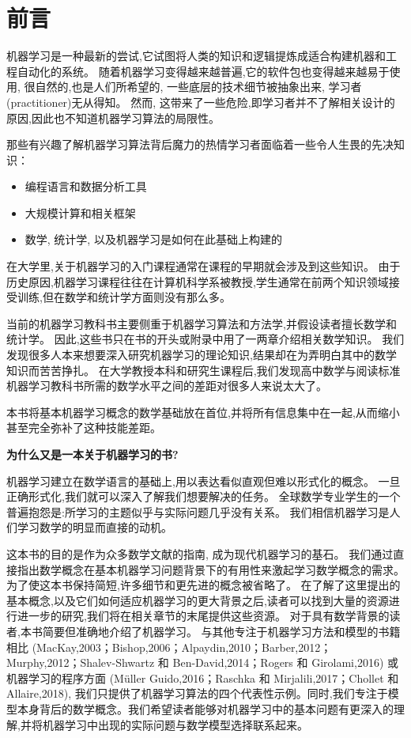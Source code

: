 \chapter{前言}

机器学习是一种最新的尝试,它试图将人类的知识和逻辑提炼成适合构建机器和工程自动化的系统。
随着机器学习变得越来越普遍,它的软件包也变得越来越易于使用,
很自然的,也是人们所希望的, 一些底层的技术细节被抽象出来, 学习者(practitioner)无从得知。
然而, 这带来了一些危险,即学习者并不了解相关设计的原因,因此也不知道机器学习算法的局限性。

那些有兴趣了解机器学习算法背后魔力的热情学习者面临着一些令人生畏的先决知识：

\begin{itemize}
	\item 编程语言和数据分析工具
	\item 大规模计算和相关框架
	\item 数学, 统计学, 以及机器学习是如何在此基础上构建的
\end{itemize}

在大学里,关于机器学习的入门课程通常在课程的早期就会涉及到这些知识。
由于历史原因,机器学习课程往往在计算机科学系被教授,学生通常在前两个知识领域接受训练,但在数学和统计学方面则没有那么多。

当前的机器学习教科书主要侧重于机器学习算法和方法学,并假设读者擅长数学和统计学。
因此,这些书只在书的开头或附录中用了一两章介绍相关数学知识。
我们发现很多人本来想要深入研究机器学习的理论知识,结果却在为弄明白其中的数学知识而苦苦挣扎。
在大学教授本科和研究生课程后,我们发现高中数学与阅读标准机器学习教科书所需的数学水平之间的差距对很多人来说太大了。

本书将基本机器学习概念的数学基础放在首位,并将所有信息集中在一起,从而缩小甚至完全弥补了这种技能差距。

\begin{center}
	\textbf{为什么又是一本关于机器学习的书?}
\end{center}

机器学习建立在数学语言的基础上,用以表达看似直观但难以形式化的概念。
一旦正确形式化,我们就可以深入了解我们想要解决的任务。
全球数学专业学生的一个普遍抱怨是:所学习的主题似乎与实际问题几乎没有关系。
我们相信机器学习是人们学习数学的明显而直接的动机。

这本书的目的是作为众多数学文献的指南, 成为现代机器学习的基石。
我们通过直接指出数学概念在基本机器学习问题背景下的有用性来激起学习数学概念的需求。
为了使这本书保持简短,许多细节和更先进的概念被省略了。
在了解了这里提出的基本概念,以及它们如何适应机器学习的更大背景之后,读者可以找到大量的资源进行进一步的研究,我们将在相关章节的末尾提供这些资源。
对于具有数学背景的读者,本书简要但准确地介绍了机器学习。
与其他专注于机器学习方法和模型的书籍相比
(MacKay,2003；Bishop,2006；Alpaydin,2010；Barber,2012；Murphy,2012；Shalev-Shwartz 和 Ben-David,2014；Rogers 和 Girolami,2016)
或机器学习的程序方面
(Müller Guido,2016；Raschka 和 Mirjalili,2017；Chollet 和 Allaire,2018),
我们只提供了机器学习算法的四个代表性示例。同时,我们专注于模型本身背后的数学概念。我们希望读者能够对机器学习中的基本问题有更深入的理解,并将机器学习中出现的实际问题与数学模型选择联系起来。


